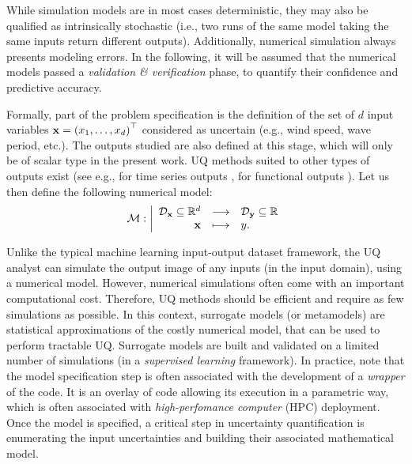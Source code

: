 While simulation models are in most cases deterministic, they may also be qualified as intrinsically stochastic (i.e., two runs of the same model taking the same inputs return different outputs).
Additionally, numerical simulation always presents modeling errors. 
In the following, it will be assumed that the numerical models passed a \textit{validation \& verification} phase, to quantify their confidence and predictive accuracy. 

Formally, part of the problem specification is the definition of the set of $d$ input variables ${\bf x} = \left(x_1, \dots, x_d\right)^\top$ considered as uncertain (e.g., wind speed, wave period, etc.). 
The outputs studied are also defined at this stage, which will only be of scalar type in the present work.  
UQ methods suited to other types of outputs exist (see e.g., for time series outputs \citealt{lataniotis_2019}, for functional outputs \citealt{auder_2012,rollon_2021}). 
Let us then define the following numerical model:
\begin{equation}
\mathcal{M} : \bigg|
    \begin{array}{rcl}
        \mathcal{D}_{{\bf x}} \subseteq \mathbb{R}^d & \longrightarrow & \mathcal{D}_{{\bf y}} \subseteq \mathbb{R} \\
        {\bf x} & \longmapsto & y.
    \end{array}
    \label{eq:numerical_model}
\end{equation}

Unlike the typical machine learning input-output dataset framework, the UQ analyst can simulate the output image of any inputs (in the input domain), using a numerical model. 
However, numerical simulations often come with an important computational cost. 
Therefore, UQ methods should be efficient and require as few simulations as possible. 
In this context, surrogate models (or metamodels) are statistical approximations of the costly numerical model, that can be used to perform tractable UQ. 
Surrogate models are built and validated on a limited number of simulations (in a \textit{supervised learning} framework). 
In practice, note that the model specification step is often associated with the development of a \textit{wrapper} of the code. 
It is an overlay of code allowing its execution in a parametric way, which is often associated with \textit{high-perfomance computer} (HPC) deployment.  
Once the model is specified, a critical step in uncertainty quantification is enumerating the input uncertainties and building their associated mathematical model.


